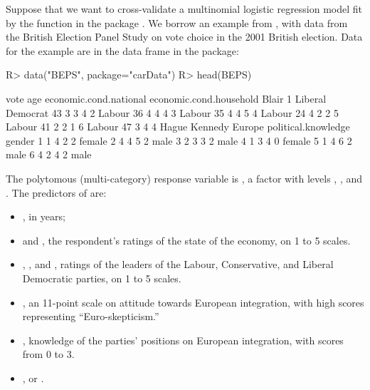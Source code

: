 \documentclass[
]{jss}
\providecommand{\tightlist}{%
  \setlength{\itemsep}{0pt}\setlength{\parskip}{0pt}}
\begin{document}
Suppose that we want to cross-validate a multinomial logistic regression
model fit by the  function in the  package
\citep{VenablesRipley:2002}. We borrow an example from \citet[Sec.
14.2.1]{Fox:2016}, with data from the British Election Panel Study on
vote choice in the 2001 British election. Data for the example are in
the  data frame in the  package:

\begin{CodeChunk}
\begin{CodeInput}
R> data("BEPS", package="carData")
R> head(BEPS)
\end{CodeInput}
\begin{CodeOutput}
              vote age economic.cond.national economic.cond.household Blair
1 Liberal Democrat  43                      3                       3     4
2           Labour  36                      4                       4     4
3           Labour  35                      4                       4     5
4           Labour  24                      4                       2     2
5           Labour  41                      2                       2     1
6           Labour  47                      3                       4     4
  Hague Kennedy Europe political.knowledge gender
1     1       4      2                   2 female
2     4       4      5                   2   male
3     2       3      3                   2   male
4     1       3      4                   0 female
5     1       4      6                   2   male
6     4       2      4                   2   male
\end{CodeOutput}
\end{CodeChunk}

The polytomous (multi-category) response variable is , a
factor with levels , , and
. The predictors of  are:

\begin{itemize}
\tightlist
\item
  , in years;
\item
   and , the
  respondent's ratings of the state of the economy, on 1 to 5 scales.
\item
  , , and , ratings of the leaders
  of the Labour, Conservative, and Liberal Democratic parties, on 1 to 5
  scales.
\item
  , an 11-point scale on attitude towards European
  integration, with high scores representing ``Euro-skepticism.''
\item
  , knowledge of the parties' positions on
  European integration, with scores from 0 to 3.
\item
  ,  or .
\end{itemize}
\end{document}
